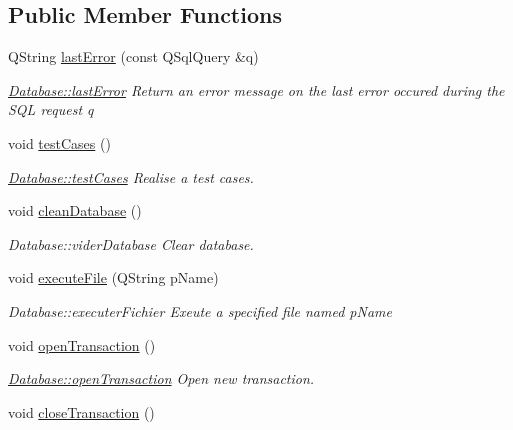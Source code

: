 \subsection*{Public Member Functions}
\begin{DoxyCompactItemize}
\item 
Q\+String \hyperlink{classDatabase_a17465cc3fe0a8b853f96599e0584cc84}{last\+Error} (const Q\+Sql\+Query \&q)
\begin{DoxyCompactList}\small\item\em \hyperlink{classDatabase_a17465cc3fe0a8b853f96599e0584cc84}{Database\+::last\+Error} Return an error message on the last error occured during the S\+Q\+L request {\itshape q} \end{DoxyCompactList}\item 
\hypertarget{classDatabase_a702ce00658c10518d2ddbbd234a0c67d}{void \hyperlink{classDatabase_a702ce00658c10518d2ddbbd234a0c67d}{test\+Cases} ()}\label{classDatabase_a702ce00658c10518d2ddbbd234a0c67d}

\begin{DoxyCompactList}\small\item\em \hyperlink{classDatabase_a702ce00658c10518d2ddbbd234a0c67d}{Database\+::test\+Cases} Realise a test cases. \end{DoxyCompactList}\item 
\hypertarget{classDatabase_a6c7ca19f0107fdad000c268fc2b14ac0}{void \hyperlink{classDatabase_a6c7ca19f0107fdad000c268fc2b14ac0}{clean\+Database} ()}\label{classDatabase_a6c7ca19f0107fdad000c268fc2b14ac0}

\begin{DoxyCompactList}\small\item\em Database\+::vider\+Database Clear database. \end{DoxyCompactList}\item 
void \hyperlink{classDatabase_a06216acb010c0ea93ac2a53aa46256c2}{execute\+File} (Q\+String p\+Name)
\begin{DoxyCompactList}\small\item\em Database\+::executer\+Fichier Exeute a specified file named {\itshape p\+Name} \end{DoxyCompactList}\item 
\hypertarget{classDatabase_ace56e75784477e79197485e9b5980804}{void \hyperlink{classDatabase_ace56e75784477e79197485e9b5980804}{open\+Transaction} ()}\label{classDatabase_ace56e75784477e79197485e9b5980804}

\begin{DoxyCompactList}\small\item\em \hyperlink{classDatabase_ace56e75784477e79197485e9b5980804}{Database\+::open\+Transaction} Open new transaction. \end{DoxyCompactList}\item 
\hypertarget{classDatabase_a8322990bcba006d0d82ac069ad6e0307}{void \hyperlink{classDatabase_a8322990bcba006d0d82ac069ad6e0307}{close\+Transaction} ()}\label{classDatabase_a8322990bcba006d0d82ac069ad6e0307}


\end{DoxyCompactItemize}
